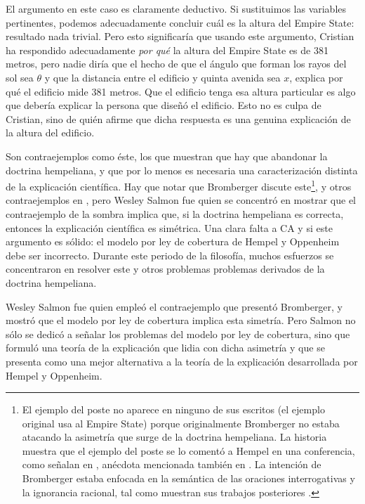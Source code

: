 El argumento en este caso es claramente deductivo. Si
sustituimos las variables pertinentes, podemos adecuadamente
concluir cuál es la altura del Empire State: resultado nada
trivial. Pero esto significaría que usando este argumento,
Cristian ha respondido adecuadamente \emph{por qué} la
altura del Empire State es de 381 metros, pero nadie diría
que el hecho de que el ángulo que forman los rayos del sol
sea $ \theta $ y que la distancia entre el edificio y quinta
avenida sea $ x $, explica por qué el edificio mide 381
metros. Que el edificio tenga esa altura particular es algo
que debería explicar la persona que diseñó el edificio. Esto
no es culpa de Cristian, sino de quién afirme que dicha
respuesta es una genuina explicación de la altura del
edificio.

Son contraejemplos como éste, los que muestran que hay que
abandonar la doctrina hempeliana, y que por lo menos es
necesaria una caracterización distinta de la explicación
científica. Hay que notar que Bromberger discute
este\footnote{ 
  El ejemplo del poste no aparece en ninguno de sus escritos
  (el ejemplo original usa al Empire State) porque
  originalmente Bromberger no estaba atacando la asimetría
  que surge de la doctrina hempeliana. La historia muestra
  que el ejemplo del poste se lo comentó a Hempel en una
  conferencia, como señalan en \parencite{mitBromberger},
  anécdota mencionada también en
  \parencite[p.~81]{Dewulf2022}. La intención de Bromberger
  estaba enfocada en la semántica de las oraciones
  interrogativas y la ignorancia racional, tal como muestran
  sus trabajos posteriores \parencite{Bromberger1992}.
},
y otros contraejemplos en \citeyear{Bromberger1966}, pero
Wesley Salmon fue quien se concentró en mostrar que el
contraejemplo de la sombra implica que, si la doctrina
hempeliana es correcta, entonces la explicación científica
es simétrica. Una clara falta a CA y si este argumento es
sólido: el modelo por ley de cobertura de Hempel y Oppenheim
debe ser incorrecto. Durante este periodo de la filosofía,
muchos esfuerzos se concentraron en resolver este y otros
problemas problemas derivados de la doctrina hempeliana.

Wesley Salmon fue quien empleó el contraejemplo que presentó
Bromberger, y mostró que el modelo por ley de cobertura
implica esta simetría. Pero Salmon no sólo se dedicó a
señalar los problemas del modelo por ley de cobertura, sino
que formuló una teoría de la explicación que lidia con dicha
asimetría y que se presenta como una mejor alternativa a la
teoría de la explicación desarrollada por Hempel y 
Oppenheim.

